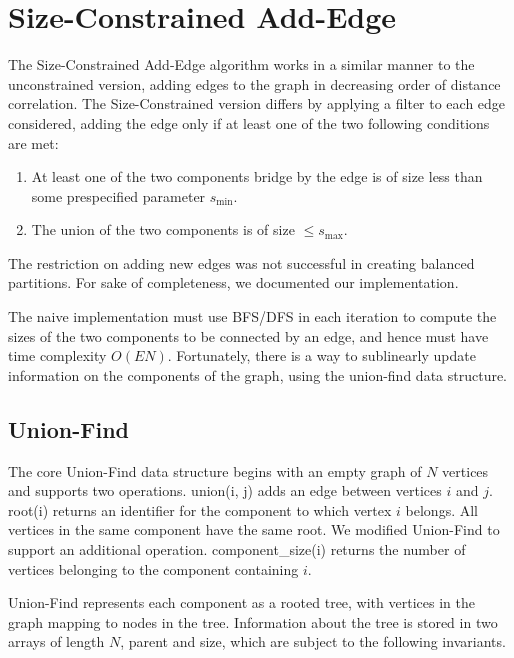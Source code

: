 \section{Size-Constrained Add-Edge}

The Size-Constrained Add-Edge algorithm works in a similar manner to the
unconstrained version, adding edges to the graph in decreasing order of
distance correlation. The Size-Constrained version differs by applying
a filter to each edge considered, adding the edge only if at least one
of the two following conditions are met:

\begin{enumerate}[1.]
\item
At least one of the two components bridge by the edge is of size less
than some prespecified parameter $s_{\min}$.

\item
The union of the two components is of size $\leq s_{\max}$.
\end{enumerate}

The restriction on adding new edges was not successful in creating
balanced partitions. For sake of completeness, we documented our
implementation.

The naive implementation must use BFS/DFS in each iteration to compute
the sizes of the two components to be connected by an edge, and hence
must have time complexity $O(EN)$. Fortunately, there is a way to
sublinearly update information on the components of the graph, using
the union-find data structure.

\subsection{Union-Find}

The core Union-Find data structure begins with an empty graph of $N$
vertices and supports two operations. union(i, j) adds an edge between
vertices $i$ and $j$. root(i) returns an identifier for the component
to which vertex $i$ belongs. All vertices in the same component have the
same root. We modified Union-Find to support an additional operation.
component\_size(i) returns the number of vertices belonging to the
component containing $i$.

Union-Find represents each component as a rooted tree, with vertices in
the graph mapping to nodes in the tree. Information about the tree is
stored in two arrays of length $N$, parent and size, which are subject
to the following invariants.

